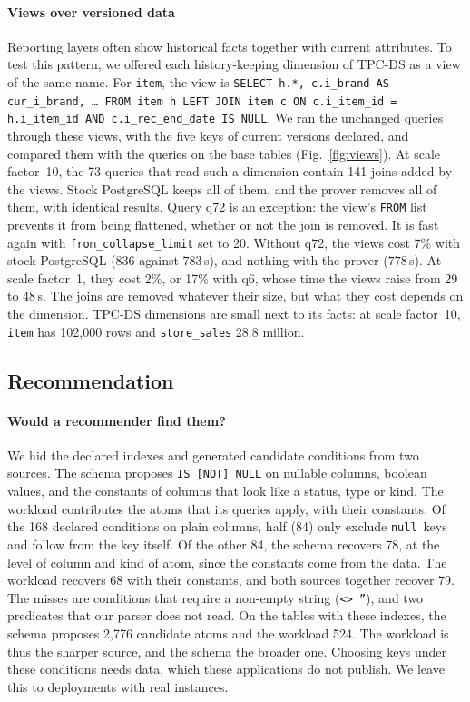\documentclass[conference]{IEEEtran}
\theoremstyle{definition}
\newcommand{\sql}[1]{\texttt{#1}}
\newcommand{\nul}{\texttt{null}}
\newif\ifextended
\begin{document}
\paragraph*{Views over versioned data} Reporting layers often show historical facts together with current
attributes. To test this pattern, we offered each history-keeping dimension of TPC-DS as a view of the same name. For
\sql{item}, the view is
\sql{SELECT h.*, c.i\_brand AS cur\_i\_brand, \ldots\ FROM item h LEFT JOIN item c ON c.i\_item\_id = h.i\_item\_id AND
c.i\_rec\_end\_date IS NULL}. We ran the unchanged queries through these views, with the five keys of current versions
declared, and compared them with the queries on the base tables (Fig.~\ref{fig:views}). At scale factor~10, the 73 queries
that read such a dimension contain 141 joins added by the views. Stock PostgreSQL keeps all of them, and the prover
removes all of them, with identical results. Query q72 is an exception: the view's \sql{FROM} list prevents it from being
flattened, whether or not the join is removed. It is fast again with \sql{from\_collapse\_limit} set to 20. Without q72,
the views cost 7\% with stock PostgreSQL ($836$ against $783$\,s), and nothing with the prover ($778$\,s). At scale
factor~1, they cost 2\%, or 17\% with q6, whose time the views raise from 29 to 48\,s. The joins are removed whatever
their size, but what they cost depends on the dimension. TPC-DS dimensions are small next to its facts: at scale
factor~10, \sql{item} has 102{,}000 rows and \sql{store\_sales} 28.8 million.


\ifextended
\subsection{Recommendation}\label{sec:exp-rec}


\paragraph*{Would a recommender find them?} We hid the declared indexes and generated candidate conditions from two
sources. The schema proposes \sql{IS [NOT] NULL} on nullable columns, boolean values, and the constants of columns
that look like a status, type or kind. The workload contributes the atoms that its queries apply, with their constants.
Of the 168 declared conditions on plain columns, half (84) only exclude \nul\ keys and follow from the key itself. Of the
other 84, the schema recovers 78, at the level of column and kind of atom, since the constants come from the data. The
workload recovers 68 with their constants, and both sources together recover 79. The misses are conditions that require
a non-empty string (\sql{<> ''}), and two predicates that our parser does not read. On the tables with these indexes, the
schema proposes 2{,}776 candidate atoms and the workload 524. The workload is thus the sharper source, and the schema the
broader one. Choosing keys under these conditions needs data, which these applications do not publish. We leave this to
deployments with real instances.
\end{document}
